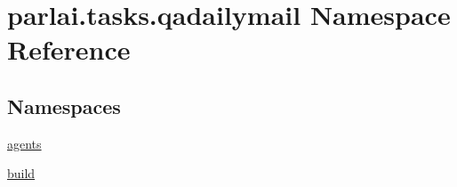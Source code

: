 \hypertarget{namespaceparlai_1_1tasks_1_1qadailymail}{}\section{parlai.\+tasks.\+qadailymail Namespace Reference}
\label{namespaceparlai_1_1tasks_1_1qadailymail}
\subsection*{Namespaces}
\begin{DoxyCompactItemize}
\item 
 \hyperlink{namespaceparlai_1_1tasks_1_1qadailymail_1_1agents}{agents}
\item 
 \hyperlink{namespaceparlai_1_1tasks_1_1qadailymail_1_1build}{build}
\end{DoxyCompactItemize}
